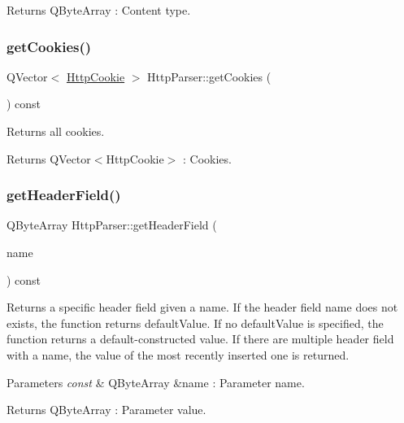 \begin{DoxyReturn}{Returns}
Q\+Byte\+Array \+: Content type. 
\end{DoxyReturn}
\mbox{\label{class_http_parser_adacd6d1e9e28ddb21e35d47a965506e3}} 
\subsubsection{\texorpdfstring{get\+Cookies()}{getCookies()}}
{\footnotesize\ttfamily Q\+Vector$<$ \mbox{\hyperlink{class_http_cookie}{Http\+Cookie}} $>$ Http\+Parser\+::get\+Cookies (\begin{DoxyParamCaption}{ }\end{DoxyParamCaption}) const}



Returns all cookies. 

\begin{DoxyReturn}{Returns}
Q\+Vector$<$\+Http\+Cookie$>$ \+: Cookies. 
\end{DoxyReturn}
\mbox{\label{class_http_parser_aa754b731300bd5cf6dc82fa038089aaa}} 
\subsubsection{\texorpdfstring{get\+Header\+Field()}{getHeaderField()}}
{\footnotesize\ttfamily Q\+Byte\+Array Http\+Parser\+::get\+Header\+Field (\begin{DoxyParamCaption}\item[{const Q\+Byte\+Array \&}]{name }\end{DoxyParamCaption}) const}



Returns a specific header field given a name. If the header field name does not exists, the function returns default\+Value. If no default\+Value is specified, the function returns a default-\/constructed value. If there are multiple header field with a name, the value of the most recently inserted one is returned. 


\begin{DoxyParams}{Parameters}
{\em const} & Q\+Byte\+Array \&name \+: Parameter name. \\
\hline
\end{DoxyParams}
\begin{DoxyReturn}{Returns}
Q\+Byte\+Array \+: Parameter value. 
\end{DoxyReturn}
\mbox{\label{class_http_parser_ad1db732c8824dd7e91653fd956fc3bf5}} 
